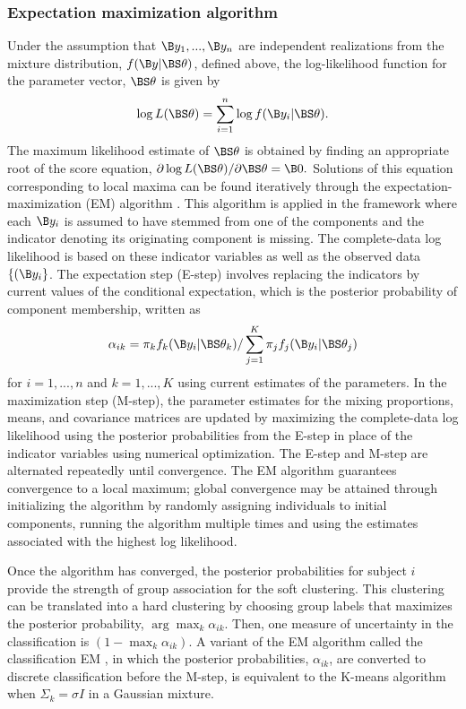 \subsubsection{Expectation maximization algorithm}
Under the assumption that $\B y_{1},...,\B y_{n}$ are independent realizations from the mixture distribution, $f(\B y | \BS\theta)$, defined above, the log-likelihood function for the parameter vector, $\BS \theta$ is given by
$$\log L(\BS\theta)=\sum^{n}_{i=1}\log f(\B y_{i}|\BS \theta).$$
The maximum likelihood estimate of $\BS\theta$ is obtained by finding an appropriate root of the score equation, $\partial \log L(\BS\theta)/\partial \BS\theta=\B 0.$
Solutions of this equation corresponding to local maxima can be found iteratively through the expectation-maximization (EM) algorithm \cite{dempster1977}. This algorithm is applied in the framework where each $\B y_{i}$ is assumed to have stemmed from one of the components and the indicator denoting its originating component is missing. The complete-data log likelihood is based on these indicator variables as well as the observed data $\{(\B y_{i}\}$. The expectation step (E-step) involves replacing the indicators by current values of the conditional expectation, which is the posterior probability of component membership, written as
$$\alpha_{ik}=\pi_{k}f_{k}(\B y_{i}|\BS\theta_{k})/\sum_{j=1}^{K}\pi_{j}f_{j}(\B y_{i}|\BS \theta_{j})$$
for $i=1,...,n$ and $k=1,...,K$ using current estimates of the parameters. In the maximization step (M-step), the parameter estimates for the mixing proportions, means, and covariance matrices are updated by maximizing the complete-data log likelihood using the posterior probabilities from the E-step in place of the indicator variables using numerical optimization. The E-step and M-step are alternated repeatedly until convergence. The EM algorithm guarantees convergence to a local maximum; global convergence may be attained through initializing the algorithm by randomly assigning individuals to initial components, running the algorithm multiple times and using the estimates associated with the highest log likelihood.

Once the algorithm has converged, the posterior probabilities for subject $i$ provide the strength of group association for the soft clustering. This clustering can be translated into a hard clustering by choosing group labels that maximizes the posterior probability, $\arg\max_k \alpha_{ik}$. Then, one measure of uncertainty in the classification is $(1-\max_k\alpha_{ik}).$ A variant of the EM algorithm called the classification EM \cite{celeuxgovaert1992}, in which the posterior probabilities, $\alpha_{ik}$, are converted to discrete classification before the M-step, is equivalent to the K-means algorithm when $\Sigma_{k} =\sigma I$ in a Gaussian mixture. 




